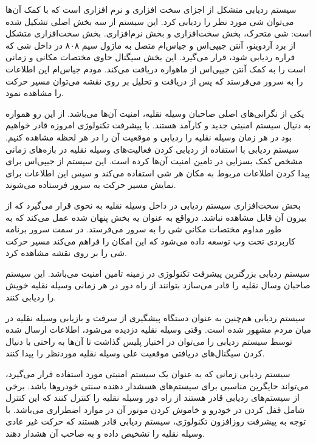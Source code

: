 سیستم ردیابی متشکل از اجزای سخت‌ افزاری و نرم ‌افزاری است که با کمک آن‌ها می‌توان شی مورد نظر را ردیابی کرد. این سیستم از سه بخش اصلی تشکیل شده است: شی متحرک، بخش سخت‌افزاری و بخش نرم‌افزاری.
بخش سخت‌افزاری متشکل از برد آردوینو، آنتن جیپی‌اس و جیاس‌ام متصل به ماژول سیم ۸۰۸  در داخل شی که قراره ردیابی شود، قرار می‌گیرد. این بخش سیگنال حاوی مختصات مکانی و زمانی است را به کمک آنتن جیپی‌اس از ماهواره دریافت می‌کند. مودم جیاس‌ام این اطلاعات را به سرور می‌فرستد که پس از دریافت و تحلیل بر روی نقشه می‌توان مسیر حرکت را مشاهده نمود.


 یکی از نگرانی‌های اصلی صاحبان وسیله نقلیه، امنیت آن‌ها می‌باشد. از این رو همواره به دنیال سیستم امنیتی جدید و کارآمد هستند. با پیشرفت تکنولوژی امروزه قادر خواهیم بود در هر زمان وسیله نقلیه را ردیابی و موقعیت آن را در هر لحظه مشاهده کنیم. سیستم ردیابی با استفاده از ردیابی  کردن فعالیت‌های وسیله نقلیه در بازه‌های زمانی مشخص کمک بسزایی در تامین امنیت آن‌ها کرده است. این سیستم از جیپی‌اس برای پیدا کردن اطلاعات مربوط به مکان هر شی استفاده می‌کند و سپس  این اطلاعات برای نمایش مسیر حرکت به سرور فرستاده می‌شوند.
 
 
 بخش سخت‌افزاری سیستم ردیابی در داخل وسیله نقلیه به نحوی قرار می‌گیرد که از بیرون آن قابل مشاهده نباشد. درواقع به عنوان یه بخش پنهان شده عمل می‌کند که به طور مداوم مختصات مکانی شی را به سرور می‌فرستد.
 در سمت سرور برنامه کاربردی تحت وب توسعه داده می‌شود که این امکان را فراهم می‌کند  مسیر حرکت شی را بر روی نقشه مشاهده کرد.
 
 سیستم ردیابی بزرگترین پیشرفت تکنولوژی در زمینه تامین امنیت می‌باشد. این سیستم صاحبان وسال نقلیه را قادر می‌سازد بتوانند از راه دور در هر زمانی وسیله نقلیه خویش را ردیابی کنند.
 
 
 سیستم ردیابی هم‌چنین به عنوان دستگاه پیشگیری از سرقت و بازیابی وسیله نقلیه در میان مردم مشهور شده است. وقتی وسیله نقلیه دزدیده می‌شود، اطلاعات ارسال شده توسط سیستم ردیابی را می‌توان در اختیار پلیس گذاشت تا آن‌ها به راحتی با دنیال کردن سیگنال‌های دریافتی موقعیت علی وسیله نقلیه موردنظر را پیدا کنند.
 
 
 سیستم ردیابی زمانی که به عنوان یک سیستم امنیتی مورد استفاده قرار می‌گیرد، می‌تواند حایگرین مناسبی برای سیستم‌های هسشدار دهنده سنتی خودروها باشد. برخی از سیستم‌های ردیابی قادر هستند از راه دور وسیله نقلیه را کنترل کنند که این کنترل شامل قفل کردن در خودرو و خاموش کردن موتور آن در موارد اضطراری می‌باشد. با توجه به پیشرفت روزافزون تکنولوژی، سیستم ردیابی قادر هستند که حرکت غیر عادی وسیله نقلیه را تشخیص داده و به صاحب آن هشدار دهند.
 
